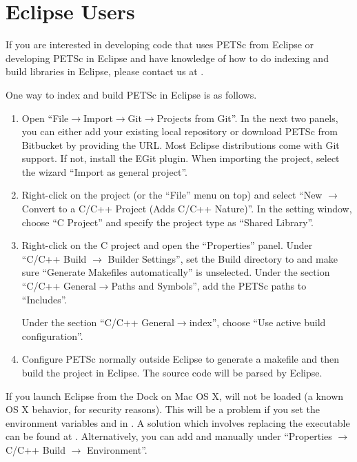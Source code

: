 {{{\section{Eclipse Users} 
If you are interested in developing code that uses PETSc from Eclipse or developing PETSc in Eclipse and have knowledge of how to do indexing and build libraries in Eclipse, please contact us at \href{mailto:petsc-dev@mcs.anl.gov}{}.

One way to index and build PETSc in Eclipse is as follows.
\begin{enumerate}
  \item Open ``File$\rightarrow$Import$\rightarrow$Git$\rightarrow$Projects from Git''.
  In the next two panels, you can either add your existing local repository or download PETSc from Bitbucket by providing the URL.
  Most Eclipse distributions come with Git support. If not, install the EGit plugin. When importing the project, select the wizard ``Import as general project''.
  \item Right-click on the project (or the ``File'' menu on top) and select ``New $\rightarrow$ Convert to a C/C++ Project (Adds C/C++ Nature)''.
  In the setting window, choose ``C Project'' and specify the project type as ``Shared Library''.
  \item Right-click on the C project and open the ``Properties'' panel. Under ``C/C++ Build $\rightarrow$ Builder Settings'',
  set the Build directory to  and make sure ``Generate Makefiles automatically'' is unselected.
  Under the section ``C/C++ General$\rightarrow$Paths and Symbols'', add the PETSc paths to ``Includes''.
  Under the section ``C/C++ General$\rightarrow$index'', choose ``Use active build configuration''.
  \item Configure PETSc normally outside Eclipse to generate a makefile and then build the project in Eclipse. The source code will be parsed by Eclipse.
\end{enumerate}

If you launch Eclipse from the Dock on Mac OS X,  will not be loaded (a known OS X behavior, for security reasons).
This will be a problem if you set the environment variables  and  in .
A solution which involves replacing the executable can be found at
\href{http://stackoverflow.com/questions/829749}
{}.
Alternatively, you can add  and  manually under ``Properties $\rightarrow$ C/C++ Build $\rightarrow$ Environment''.

}}}

